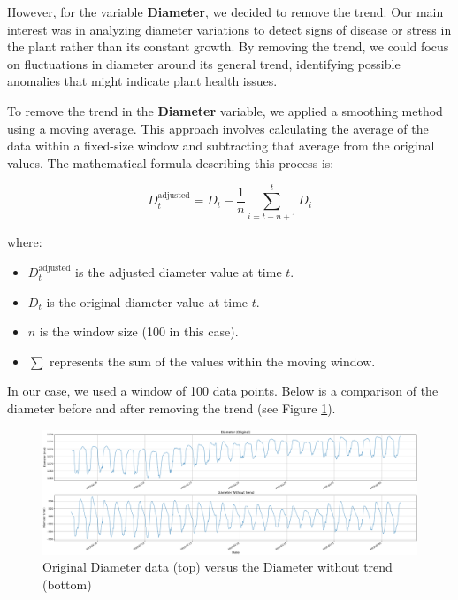 However, for the variable \textbf{Diameter}, we decided to remove the trend. Our main interest was in analyzing diameter variations to detect signs of disease or stress in the plant rather than its constant growth. By removing the trend, we could focus on fluctuations in diameter around its general trend, identifying possible anomalies that might indicate plant health issues.

To remove the trend in the \textbf{Diameter} variable, we applied a smoothing method using a moving average. This approach involves calculating the average of the data within a fixed-size window and subtracting that average from the original values. The mathematical formula describing this process is:

\begin{equation}
D_t^{\text{adjusted}} = D_t - \frac{1}{n} \sum_{i=t-n+1}^{t} D_i
\end{equation}

where:
\begin{itemize}
    \item $D_t^{\text{adjusted}}$ is the adjusted diameter value at time $t$.
    \item $D_t$ is the original diameter value at time $t$.
    \item $n$ is the window size (100 in this case).
    \item $\sum$ represents the sum of the values within the moving window.
\end{itemize}

In our case, we used a window of 100 data points. Below is a comparison of the diameter before and after removing the trend (see Figure \ref{WithoutTrend_Diameter}).

\begin{figure}[htbp]
    \centering
    \includegraphics[width=15 cm]{5_ChapterDesign/figuras/3_Trend/WithoutTrend_Diameter}
    \caption{Original Diameter data (top) versus the Diameter without trend (bottom)}
    \label{WithoutTrend_Diameter}
\end{figure}


